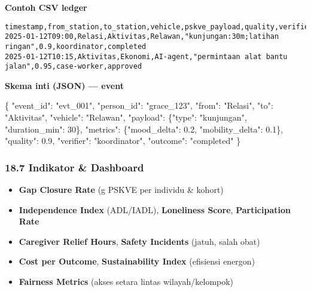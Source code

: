 \documentclass[
  letterpaper,
  DIV=11,
  numbers=noendperiod]{scrartcl}
\newenvironment{Shaded}{\begin{snugshade}}{\end{snugshade}}
\newcommand{\DataTypeTok}[1]{\textcolor[rgb]{0.68,0.00,0.00}{#1}}
\newcommand{\DecValTok}[1]{\textcolor[rgb]{0.68,0.00,0.00}{#1}}
\newcommand{\FloatTok}[1]{\textcolor[rgb]{0.68,0.00,0.00}{#1}}
\newcommand{\FunctionTok}[1]{\textcolor[rgb]{0.28,0.35,0.67}{#1}}
\newcommand{\StringTok}[1]{\textcolor[rgb]{0.13,0.47,0.30}{#1}}
\providecommand{\tightlist}{%
  \setlength{\itemsep}{0pt}\setlength{\parskip}{0pt}}
\begin{document}
\textbf{Contoh CSV ledger}

\begin{verbatim}
timestamp,from_station,to_station,vehicle,pskve_payload,quality,verifier,outcome
2025-01-12T09:00,Relasi,Aktivitas,Relawan,"kunjungan:30m;latihan ringan",0.9,koordinator,completed
2025-01-12T10:15,Aktivitas,Ekonomi,AI-agent,"permintaan alat bantu jalan",0.95,case-worker,approved
\end{verbatim}

\textbf{Skema inti (JSON) --- event}

\begin{Shaded}
\begin{Highlighting}[]
\FunctionTok{\{}
  \DataTypeTok{"event\_id"}\FunctionTok{:} \StringTok{"evt\_001"}\FunctionTok{,}
  \DataTypeTok{"person\_id"}\FunctionTok{:} \StringTok{"grace\_123"}\FunctionTok{,}
  \DataTypeTok{"from"}\FunctionTok{:} \StringTok{"Relasi"}\FunctionTok{,}
  \DataTypeTok{"to"}\FunctionTok{:} \StringTok{"Aktivitas"}\FunctionTok{,}
  \DataTypeTok{"vehicle"}\FunctionTok{:} \StringTok{"Relawan"}\FunctionTok{,}
  \DataTypeTok{"payload"}\FunctionTok{:} \FunctionTok{\{}\DataTypeTok{"type"}\FunctionTok{:} \StringTok{"kunjungan"}\FunctionTok{,} \DataTypeTok{"duration\_min"}\FunctionTok{:} \DecValTok{30}\FunctionTok{\},}
  \DataTypeTok{"metrics"}\FunctionTok{:} \FunctionTok{\{}\DataTypeTok{"mood\_delta"}\FunctionTok{:} \FloatTok{0.2}\FunctionTok{,} \DataTypeTok{"mobility\_delta"}\FunctionTok{:} \FloatTok{0.1}\FunctionTok{\},}
  \DataTypeTok{"quality"}\FunctionTok{:} \FloatTok{0.9}\FunctionTok{,}
  \DataTypeTok{"verifier"}\FunctionTok{:} \StringTok{"koordinator"}\FunctionTok{,}
  \DataTypeTok{"outcome"}\FunctionTok{:} \StringTok{"completed"}
\FunctionTok{\}}
\end{Highlighting}
\end{Shaded}

\subsubsection{18.7 Indikator \& Dashboard}\label{indikator-dashboard}

\begin{itemize}
\tightlist
\item
  \textbf{Gap Closure Rate} (\textbar g\textbar{} PSKVE per individu \&
  kohort)
\item
  \textbf{Independence Index} (ADL/IADL), \textbf{Loneliness Score},
  \textbf{Participation Rate}
\item
  \textbf{Caregiver Relief Hours}, \textbf{Safety Incidents} (jatuh,
  salah obat)
\item
  \textbf{Cost per Outcome}, \textbf{Sustainability Index} (efisiensi
  energon)
\item
  \textbf{Fairness Metrics} (akses setara lintas wilayah/kelompok)
\end{itemize}
\end{document}
